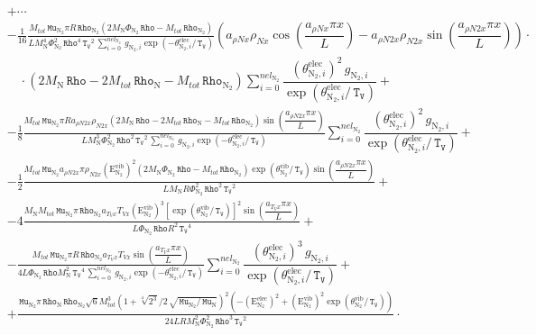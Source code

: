 \documentclass[10pt]{article}
\newcommand{\diff}[2] {\dfrac{\partial #1 }{\partial #2}}
\newcommand{\Rho}{\,\mathtt{Rho}}
\newcommand{\TV}{\,\mathtt{T_V}}
\newcommand{\N}{\text{N}}
\newcommand{\elec}{\text{elec}}
\newcommand{\vib}{\text{vib}}
\newcommand{\E}{\text{E}}
\newcommand{\Mu}{\, \mathtt{Mu}}
\newcommand{\mix}{\text{mix}\,}
\newcommand{\DKappaevDx}{\diff{\kappa^{ev}_{\mix}}{x}\,}
\newcommand{\eelecNdoisden}{\,\sum_{i=0}^{nel_{\N_2}}  \, g_{\N_2,i}   \exp \left( -\theta^{\elec}_{\N_2,i} /  \TV \right)}
\begin{document}
\begin{equation*}
\begin{split} %
&+\cdots\\
&- \frac{1}{16} \frac{M_{tot} \Mu_{\N_2} \pi R \Rho_{\N_2} \left(2 M_{\N} \Phi_{\N_2} \Rho - M_{tot} \Rho_{\N_2} \right) }{L
M_{\N}^{4} \Phi_{\N_2}^{2} \Rho^{4} \TV^{2} \eelecNdoisden} \left(a_{\rho N x} \rho_{N x} \cos\left(\dfrac{a_{\rho N x} \pi
x}{L}\right) - a_{\rho N2 x} \rho_{N2 x} \sin\left(\dfrac{a_{\rho N2 x} \pi x}{L}\right)\right) \cdot\\
 &\quad \cdot\left(2 M_{\N} \Rho - 2 M_{tot} \Rho_{\N} - M_{tot} \Rho_{\N_2}\right)  \sum_{i=0}^{nel_{\N_2}} \dfrac{ \left(
\theta^{\elec}_{\N_2,i} \right)^2   \, g_{\N_2,i} }{ \exp \left( \theta^{\elec}_{\N_2,i} /  \TV \right)} +\\ 
%
&- \frac{1}{8}\frac{M_{tot} \Mu_{\N_2} \pi R a_{\rho N2 x} \rho_{N2 x} \left(2 M_{\N} \Rho - 2 M_{tot} \Rho_{\N} - M_{tot}
\Rho_{\N_2}\right) \sin\left(\dfrac{a_{\rho N2 x} \pi x}{L}\right)}{L M_{\N}^{3} \Phi_{\N_2}^{2} \Rho^{2} \TV^{2} \eelecNdoisden} 
\sum_{i=0}^{nel_{\N_2}} \dfrac{ \left( \theta^{\elec}_{\N_2,i} \right)^2   \, g_{\N_2,i} }{ \exp \left( \theta^{\elec}_{\N_2,i} / 
\TV \right)}+\\ 
%
&- \frac{1}{2}\frac{M_{tot} \Mu_{\N_2} a_{\rho N2 x} \pi \rho_{N2 x} \left( \E^{\vib}_{\N_2} \right)^2  \left(2 M_{\N} \Phi_{\N_2}
\Rho - M_{tot} \Rho_{\N_2} \right) \exp\left( \theta^{\vib}_{\N_2} / \TV \right) \sin\left(\dfrac{a_{\rho N2 x} \pi
x}{L}\right)}{L M_{\N} R \Phi_{\N_2}^{2} \Rho^{2} \TV^{2}} +\\ 
%
&- 4 \frac{M_{\N} M_{tot} \Mu_{\N_2} \pi \Rho_{\N_2} a_{T_V x} T_{Vx} \left( \E^{\vib}_{\N_2} \right)^3 \left[ \exp\left(
\theta^{\vib}_{\N_2} / \TV \right) \right]^2 \sin\left(\dfrac{a_{T_V x} \pi x}{L}\right)}{L \Phi_{\N_2} \Rho R^{2} \TV^{4}} +\\ 
%
&- \frac{M_{tot} \Mu_{\N_2} \pi R \Rho_{\N_2} a_{T_V x} T_{Vx} \sin\left(\dfrac{a_{T_V x} \pi x}{L}\right)}{4 L \Phi_{\N_2} \Rho
M_{\N}^{2} \TV^{4} \eelecNdoisden }  \sum_{i=0}^{nel_{\N_2}} \dfrac{ \left( \theta^{\elec}_{\N_2,i} \right)^3   \, g_{\N_2,i} }{
\exp \left( \theta^{\elec}_{\N_2,i} /  \TV \right)} +\\ 
%
&+ \frac{\Mu_{\N_2} \pi \Rho_{\N} \Rho_{\N_2} \sqrt{6} M_{tot}^{3} \left(1 + \sqrt[4]{2^3} / 2 \, \sqrt{ \Mu_{\N_2} / \Mu_{\N}
}\right)^{2} \left(- \left( \E^{\elec}_{\N_2} \right)^2 + \left( \E^{\vib}_{\N_2} \right)^2 \exp\left( \theta^{\vib}_{\N_2} / \TV
\right) \right) }{24 L R M_{\N}^{2} \Phi_{\N_2}^{2} \Rho^{3} \TV^{2}} \cdot\\

\end{split}
\end{equation*}
\end{document}
